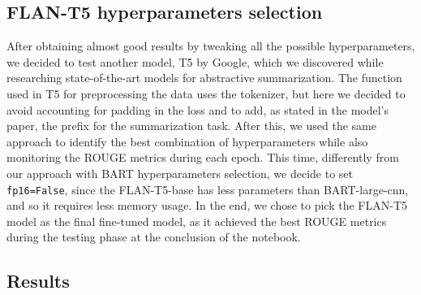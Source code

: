 \documentclass[10pt,twocolumn,letterpaper]{article}
\begin{document}
\subsection{FLAN-T5 hyperparameters selection}
After obtaining almost good results by tweaking all the possible hyperparameters, we decided to test another model, T5 by Google, which we discovered while researching state-of-the-art models for abstractive summarization.
The function used in T5 for preprocessing the data uses the tokenizer, but here we decided to avoid accounting for padding in the loss and to add, as stated in the model's paper, the prefix for the summarization task.
After this, we used the same approach to identify the best combination of hyperparameters while also monitoring the ROUGE metrics during each epoch.
This time, differently from our approach with BART hyperparameters selection, we decide to set \texttt{fp16=False}, since the FLAN-T5-base has less parameters than BART-large-cnn, and so it requires less memory usage.
In the end, we chose to pick the FLAN-T5 model as the final fine-tuned model, as it achieved the best ROUGE metrics during the testing phase at the conclusion of the notebook.

\subsection{Results}
\end{document}
